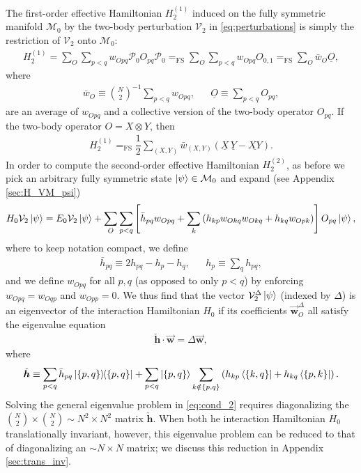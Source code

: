 \documentclass[nofootinbib,notitlepage,11pt]{revtex4-2}
\newcommand{\f}[2]{\dfrac{#1}{#2}} %
\newcommand{\p}[1]{\left(#1\right)} %
\renewcommand{\sp}[1]{\left[#1\right]} %
\renewcommand{\set}[1]{\left\{#1\right\}} %
\renewcommand{\c}{\cdot} %
\newcommand{\m}{\bm} %
\renewcommand{\v}{\vec} %
\newcommand{\1}{\mathds{1}}
\newcommand{\M}{\mathcal{M}}
\renewcommand{\P}{\mathcal{P}}
\newcommand{\V}{\mathcal{V}}
\newcommand{\EQFS}{=_{\text{FS}}}
\newcommand{\col}{\underline}
\begin{document}
The first-order effective Hamiltonian $H_2^{(1)}$ induced on the fully
symmetric manifold $\M_0$ by the two-body perturbation $\V_2$ in
\eqref{eq:perturbations} is simply the restriction of $\V_2$ onto
$\M_0$:
\begin{align}
  H_2^{(1)} = \sum_O \sum_{p<q} w_{Opq} \P_0 O_{pq} \P_0
  \EQFS \sum_O \sum_{p<q} w_{Opq} O_{0,1}
  \EQFS \sum_O \bar w_O \col{O},
\end{align}
where
\begin{align}
  \bar w_O \equiv {N \choose 2}^{-1} \sum_{p<q} w_{Opq},
  &&
  \col{O} \equiv \sum_{p<q} O_{pq},
\end{align}
are an average of $w_{Opq}$ and a collective version of the two-body
operator $O_{pq}$.  If the two-body operator $O=X\otimes Y$, then
\begin{align}
  H_2^{(1)} \EQFS \f12 \sum_{\p{X,Y}} \bar w_{\p{X,Y}}
  \p{\col{X}\,\col{Y} - \col{XY}}.
\end{align}
In order to compute the second-order effective Hamiltonian
$H_2^{(2)}$, as before we pick an arbitrary fully symmetric state
$\ket\psi\in\M_0$ and expand (see Appendix \ref{sec:H_VM_psi})
\begin{align}
  H_0 \V_2 \ket\psi
  = E_0 \V_2 \ket\psi
  + \sum_O \sum_{p<q} \sp{\bar h_{pq} w_{Opq}
    + \sum_k \p{h_{kp} w_{Okq} w_{Okq} + h_{kq} w_{Opk}}}
  O_{pq} \ket\psi,
  \label{eq:H_V2_psi}
\end{align}
where to keep notation compact, we define
\begin{align}
  \bar h_{pq} \equiv 2 h_{pq} - h_p - h_q,
  &&
  h_p \equiv \sum_q h_{pq},
\end{align}
and we define $w_{Opq}$ for all $p,q$ (as opposed to only $p<q$) by
enforcing $w_{Opq}=w_{Oqp}$ and $w_{Opp}=0$.  We thus find that the
vector $\V_2^\Delta\ket\psi$ (indexed by $\Delta$) is an eigenvector
of the interaction Hamiltonian $H_0$ if its coefficients
$\v{\m w}_O^\Delta$ all satisfy the eigenvalue equation
\begin{align}
  \check{\m h} \c \v{\m w} = \Delta \v{\m w},
  \label{eq:cond_2}
\end{align}
where
\begin{align}
  \check{\m h} \equiv \sum_{p<q} \bar h_{pq} \op{\set{p,q}}
  + \sum_{p<q} \ket{\set{p,q}} \sum_{k\notin\set{p,q}}
  \p{h_{kp} \bra{\set{k,q}} + h_{kq} \bra{\set{p,k}}}.
  \label{eq:h_super_mat}
\end{align}
Solving the general eigenvalue problem in \eqref{eq:cond_2} requires
diagonalizing the ${N \choose 2}\times{N \choose 2}\sim N^2\times N^2$
matrix $\check{\m h}$.  When both he interaction Hamiltonian $H_0$
translationally invariant, however, this eigenvalue problem can be
reduced to that of diagonalizing an $\sim N\times N$ matrix; we
discuss this reduction in Appendix \ref{sec:trans_inv}.
\end{document}
